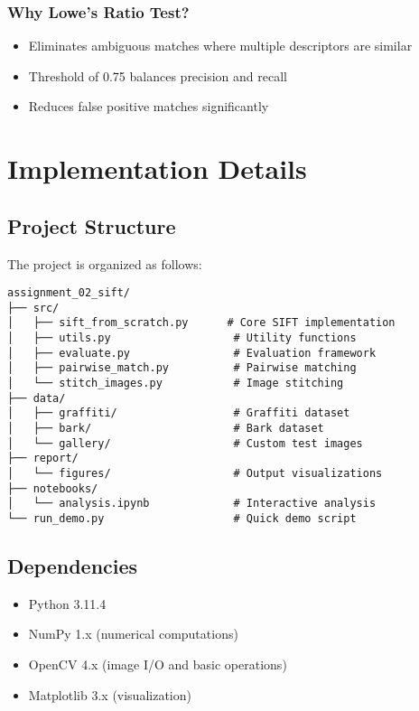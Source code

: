 \documentclass[12pt,a4paper]{article}
\begin{document}
\subsubsection{Why Lowe's Ratio Test?}
\begin{itemize}
    \item Eliminates ambiguous matches where multiple descriptors are similar
    \item Threshold of 0.75 balances precision and recall
    \item Reduces false positive matches significantly
\end{itemize}

\section{Implementation Details}

\subsection{Project Structure}
The project is organized as follows:

\begin{lstlisting}
assignment_02_sift/
├── src/
│   ├── sift_from_scratch.py      # Core SIFT implementation
│   ├── utils.py                   # Utility functions
│   ├── evaluate.py                # Evaluation framework
│   ├── pairwise_match.py          # Pairwise matching
│   └── stitch_images.py           # Image stitching
├── data/
│   ├── graffiti/                  # Graffiti dataset
│   ├── bark/                      # Bark dataset
│   └── gallery/                   # Custom test images
├── report/
│   └── figures/                   # Output visualizations
├── notebooks/
│   └── analysis.ipynb             # Interactive analysis
└── run_demo.py                    # Quick demo script
\end{lstlisting}

\subsection{Dependencies}
\begin{itemize}
    \item Python 3.11.4
    \item NumPy 1.x (numerical computations)
    \item OpenCV 4.x (image I/O and basic operations)
    \item Matplotlib 3.x (visualization)
\end{itemize}
\end{document}
